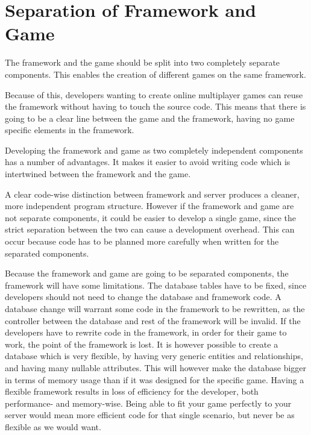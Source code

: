 \section{Separation of Framework and Game}
The framework and the game should be split into two completely separate components. This enables the creation of different games on the same framework.

Because of this, developers wanting to create online multiplayer games can reuse the framework without having to touch the source code. This means that there is going to be a clear line between the game and the framework, having no game specific elements in the framework.

Developing the framework and game as two completely independent components has a number of advantages. It makes it easier to avoid writing code which is intertwined between the framework and the game.

A clear code-wise distinction between framework and server produces a cleaner, more independent program structure. However if the framework and game are not separate components, it could be easier to develop a single game, since the strict separation between the two can cause a development overhead. This can occur because code has to be planned more carefully when written for the separated components.

Because the framework and game are going to be separated components, the framework will have some limitations. The database tables have to be fixed, since developers should not need to change the database and framework code. A database change will warrant some code in the framework to be rewritten, as the controller between the database and rest of the framework will be invalid. If the developers have to rewrite code in the framework, in order for their game to work, the point of the framework is lost. It is however possible to create a database which is very flexible, by having very generic entities and relationships, and having many nullable attributes. This will however make the database bigger in terms of memory usage than if it was designed for the specific game.
Having a flexible framework results in loss of efficiency for the developer, both performance- and memory-wise. Being able to fit your game perfectly to your server would mean more efficient code for that single scenario, but never be as flexible as we would want.